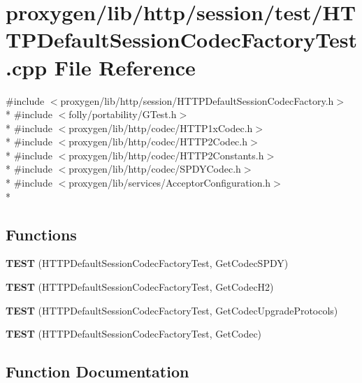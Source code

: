 \section{proxygen/lib/http/session/test/\+H\+T\+T\+P\+Default\+Session\+Codec\+Factory\+Test.cpp File Reference}
\label{HTTPDefaultSessionCodecFactoryTest_8cpp}
{\ttfamily \#include $<$proxygen/lib/http/session/\+H\+T\+T\+P\+Default\+Session\+Codec\+Factory.\+h$>$}\\*
{\ttfamily \#include $<$folly/portability/\+G\+Test.\+h$>$}\\*
{\ttfamily \#include $<$proxygen/lib/http/codec/\+H\+T\+T\+P1x\+Codec.\+h$>$}\\*
{\ttfamily \#include $<$proxygen/lib/http/codec/\+H\+T\+T\+P2\+Codec.\+h$>$}\\*
{\ttfamily \#include $<$proxygen/lib/http/codec/\+H\+T\+T\+P2\+Constants.\+h$>$}\\*
{\ttfamily \#include $<$proxygen/lib/http/codec/\+S\+P\+D\+Y\+Codec.\+h$>$}\\*
{\ttfamily \#include $<$proxygen/lib/services/\+Acceptor\+Configuration.\+h$>$}\\*
\subsection*{Functions}
\begin{DoxyCompactItemize}
\item 
{\bf T\+E\+ST} (H\+T\+T\+P\+Default\+Session\+Codec\+Factory\+Test, Get\+Codec\+S\+P\+DY)
\item 
{\bf T\+E\+ST} (H\+T\+T\+P\+Default\+Session\+Codec\+Factory\+Test, Get\+Codec\+H2)
\item 
{\bf T\+E\+ST} (H\+T\+T\+P\+Default\+Session\+Codec\+Factory\+Test, Get\+Codec\+Upgrade\+Protocols)
\item 
{\bf T\+E\+ST} (H\+T\+T\+P\+Default\+Session\+Codec\+Factory\+Test, Get\+Codec)
\end{DoxyCompactItemize}


\subsection{Function Documentation}
